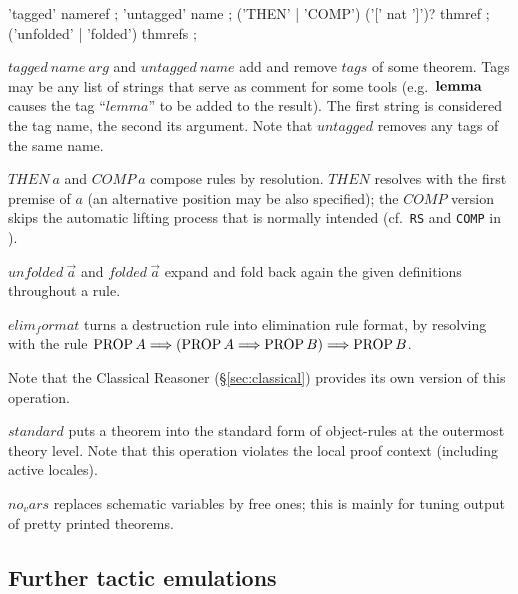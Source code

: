 \begin{rail}
  'tagged' nameref
  ;
  'untagged' name
  ;
  ('THEN' | 'COMP') ('[' nat ']')? thmref
  ;
  ('unfolded' | 'folded') thmrefs
  ;
\end{rail}

\begin{descr}

\item [$tagged~name~arg$ and $untagged~name$] add and remove $tags$ of some
  theorem.  Tags may be any list of strings that serve as comment for some
  tools (e.g.\ ${\mathord{\mathbf{lemma}}}$ causes the tag ``$lemma$'' to be added to the
  result).  The first string is considered the tag name, the second its
  argument.  Note that $untagged$ removes any tags of the same name.

\item [$THEN~a$ and $COMP~a$] compose rules by resolution.  $THEN$ resolves
  with the first premise of $a$ (an alternative position may be also
  specified); the $COMP$ version skips the automatic lifting process that is
  normally intended (cf.\ \texttt{RS} and \texttt{COMP} in
  \cite[\S5]{isabelle-ref}).
  
\item [$unfolded~\vec a$ and $folded~\vec a$] expand and fold back
  again the given definitions throughout a rule.

\item [$elim_format$] turns a destruction rule into elimination rule format,
  by resolving with the rule $\mathop{\mathrm{PROP}} A \Longrightarrow (\mathop{\mathrm{PROP}} A \Longrightarrow \mathop{\mathrm{PROP}} B) \Longrightarrow \mathop{\mathrm{PROP}}
  B$.
  
  Note that the Classical Reasoner (\S\ref{sec:classical}) provides its own
  version of this operation.

\item [$standard$] puts a theorem into the standard form of object-rules at
  the outermost theory level.  Note that this operation violates the local
  proof context (including active locales).

\item [$no_vars$] replaces schematic variables by free ones; this is mainly
  for tuning output of pretty printed theorems.

\end{descr}


\subsection{Further tactic emulations}\label{sec:tactics}

